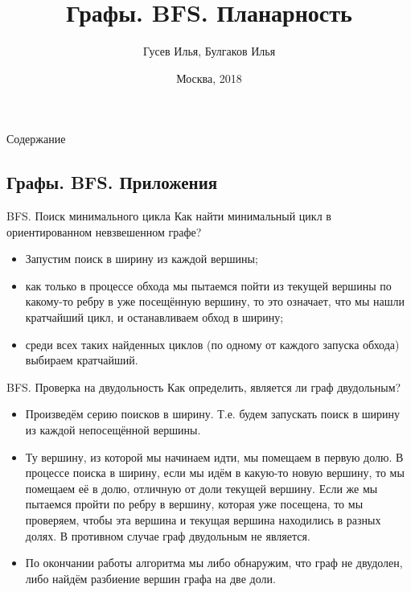 \documentclass[10pt]{beamer}
\title[\href{https://goo.gl/NRgp8K}{https://goo.gl/NRgp8K} (Term 1)]{Графы. BFS. Планарность}
\author[Гусев Илья, Булгаков Илья]{Гусев Илья, Булгаков Илья}
\institute[МФТИ] 
{Московский физико-технический институт\\*}
\date{Москва, 2018}
\begin{document}
\begin{frame}
  \titlepage
\end{frame}

\begin{frame}{Содержание}
\tableofcontents
\end{frame}

\subsection{Графы. BFS. Приложения}

\begin{frame}[fragile]{BFS. Поиск минимального цикла}
Как найти минимальный цикл в ориентированном невзвешенном графе?
    \begin{itemize}
        \item Запустим поиск в ширину из каждой вершины; 
        \item как только в процессе обхода мы пытаемся пойти из текущей вершины по какому-то ребру в уже посещённую вершину, то это означает, что мы нашли кратчайший цикл, и останавливаем обход в ширину; 
        \item среди всех таких найденных циклов (по одному от каждого запуска обхода) выбираем кратчайший.

    \end{itemize}
\end{frame}

\begin{frame}[fragile]{BFS. Проверка на двудольность}
Как определить, является ли граф двудольным?
    \begin{itemize}
        \item Произведём серию поисков в ширину. Т.е. будем запускать поиск в ширину из каждой непосещённой вершины. 
        \item Ту вершину, из которой мы начинаем идти, мы помещаем в первую долю. В процессе поиска в ширину, если мы идём в какую-то новую вершину, то мы помещаем её в долю, отличную от доли текущей вершину. Если же мы пытаемся пройти по ребру в вершину, которая уже посещена, то мы проверяем, чтобы эта вершина и текущая вершина находились в разных долях. В противном случае граф двудольным не является.
        \item По окончании работы алгоритма мы либо обнаружим, что граф не двудолен, либо найдём разбиение вершин графа на две доли.

    \end{itemize}
    
\end{frame}
\end{document}
